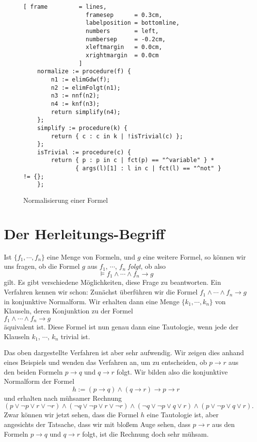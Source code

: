\begin{figure}[!ht]
  \centering
\begin{Verbatim}[ frame         = lines, 
                  framesep      = 0.3cm, 
                  labelposition = bottomline,
                  numbers       = left,
                  numbersep     = -0.2cm,
                  xleftmargin   = 0.0cm,
                  xrightmargin  = 0.0cm
                ]
    normalize := procedure(f) {
        n1 := elimGdw(f);
        n2 := elimFolgt(n1);
        n3 := nnf(n2);
        n4 := knf(n3);
        return simplify(n4);
    };
    simplify := procedure(k) {
        return { c : c in k | !isTrivial(c) };
    };
    isTrivial := procedure(c) {
        return { p : p in c | fct(p) == "^variable" } * 
               { args(l)[1] : l in c | fct(l) == "^not" } != {};
    };
\end{Verbatim} 
\vspace*{-0.3cm}
  \caption{Normalisierung einer Formel}
  \label{fig:normalize}
\end{figure}
\vspace*{\fill}


\section{Der Herleitungs-Begriff}
Ist $\{f_1,\cdots,f_n\}$ eine Menge von Formeln, und $g$ eine weitere Formel, so
k\"{o}nnen wir uns fragen, ob  die  Formel $g$ aus $f_1$, $\cdots$, $f_n$ \emph{folgt}, ob
also 
\[ \models f_1 \wedge \cdots \wedge f_n \rightarrow g \]
gilt.
Es gibt verschiedene M\"{o}glichkeiten, diese Frage zu beantworten.  Ein Verfahren kennen wir
schon: Zun\"{a}chst \"{u}berf\"{u}hren wir die Formel  $f_1 \wedge \cdots \wedge f_n \rightarrow g$ in
konjunktive Normalform.  Wir erhalten dann eine Menge
$\{k_1,\cdots,k_n\}$ von Klauseln, deren Konjunktion zu der  Formel
\\[0.2cm]
\hspace*{1.3cm} $f_1 \wedge \cdots \wedge f_n \rightarrow g$
\\[0.2cm] 
\"{a}quivalent ist.  Diese Formel ist nun genau dann eine Tautologie, wenn
jede der Klauseln $k_1$, $\cdots$, $k_n$ trivial ist.  

Das oben dargestellte Verfahren ist aber sehr aufwendig.  Wir zeigen dies anhand eines
Beispiels und wenden das Verfahren
an, um zu entscheiden, ob $p \rightarrow r$ aus den beiden Formeln $p \rightarrow q$ und
$q \rightarrow r$ folgt.   Wir bilden also die konjunktive Normalform der Formel 
\[ h := (p \rightarrow q) \wedge (q \rightarrow r) \rightarrow p \rightarrow r
\]
und erhalten nach m\"{u}hsamer Rechnung
\[
   (p \vee \neg p \vee r \vee \neg r) \wedge (\neg q \vee \neg p \vee r \vee \neg r) \wedge
   (\neg q \vee \neg p \vee q \vee r) \wedge (p \vee \neg p \vee q \vee r). 
\]
Zwar k\"{o}nnen wir jetzt sehen, dass die Formel $h$ eine Tautologie ist, aber angesichts der
Tatsache, dass wir mit blo\ss{}em Auge sehen, dass  $p \rightarrow r$ aus den Formeln $p \rightarrow q$ und
$q \rightarrow r$ folgt, ist die Rechnung  doch  sehr m\"{u}hsam.

